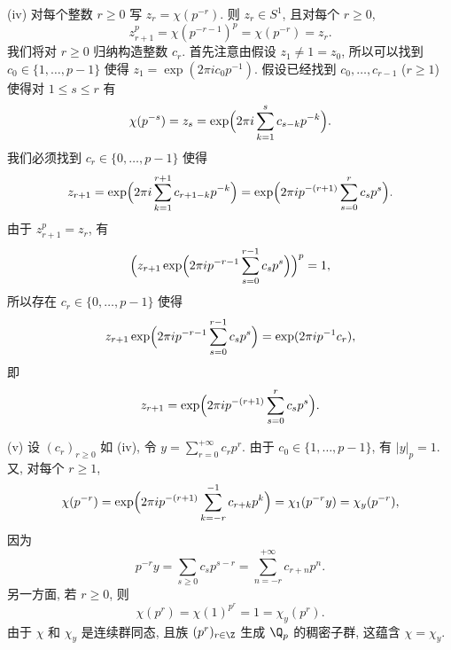 \begin{solution}
(iv) 对每个整数 $r \geq 0$ 写 $z_r = \chi(p^{-r})$. 则 $z_r \in S^1$, 且对每个 $r \geq 0$,
\[
z_{r+1}^p = \chi(p^{-r-1})^p = \chi(p^{-r}) = z_r.
\]
我们将对 $r \geq 0$ 归纳构造整数 $c_r$. 首先注意由假设 $z_1 \neq 1 = z_0$, 所以可以找到 $c_0 \in \{1, \ldots, p-1\}$ 使得 $z_1 = \exp(2\pi ic_0p^{-1})$. 假设已经找到 $c_0, \ldots, c_{r-1}$ ($r \geq 1$) 使得对 $1 \leq s \leq r$ 有
\[
\chi(p^{-s}) = z_s = \exp\Bigl(2\pi i\sum_{k=1}^s c_{s-k}p^{-k}\Bigr).
\]
我们必须找到 $c_r \in \{0, \ldots, p-1\}$ 使得
\[
z_{r+1} = \exp\Bigl(2\pi i\sum_{k=1}^{r+1}c_{r+1-k}p^{-k}\Bigr) = \exp\Bigl(2\pi ip^{-(r+1)}\sum_{s=0}^r c_sp^s\Bigr).
\]
由于 $z_{r+1}^p = z_r$, 有
\[
\Bigl(z_{r+1}\exp\Bigl(2\pi ip^{-r-1}\sum_{s=0}^{r-1}c_sp^s\Bigr)\Bigr)^p = 1,
\]
所以存在 $c_r \in \{0, \ldots, p-1\}$ 使得
\[
z_{r+1}\exp\Bigl(2\pi ip^{-r-1}\sum_{s=0}^{r-1}c_sp^s\Bigr) = \exp(2\pi ip^{-1}c_r),
\]
即
\[
z_{r+1} = \exp\Bigl(2\pi ip^{-(r+1)}\sum_{s=0}^r c_sp^s\Bigr).
\]

(v) 设 $(c_r)_{r \geq 0}$ 如 (iv), 令 $y = \sum_{r=0}^{+\infty}c_rp^r$. 由于 $c_0 \in \{1, \ldots, p-1\}$, 有 $|y|_p = 1$. 又, 对每个 $r \geq 1$,
\[
\chi(p^{-r}) = \exp\Bigl(2\pi ip^{-(r+1)}\sum_{k=-r}^{-1}c_{r+k}p^k\Bigr) = \chi_1(p^{-r}y) = \chi_y(p^{-r}),
\]
因为
\[
p^{-r}y = \sum_{s \geq 0}c_sp^{s-r} = \sum_{n=-r}^{+\infty}c_{r+n}p^n.
\]
另一方面, 若 $r \geq 0$, 则
\[
\chi(p^r) = \chi(1)^{p^r} = 1 = \chi_y(p^r).
\]
由于 $\chi$ 和 $\chi_y$ 是连续群同态, 且族 $(p^r)_{r \in \Z}$ 生成 $\Q_p$ 的稠密子群, 这蕴含 $\chi = \chi_y$.


\end{solution}
